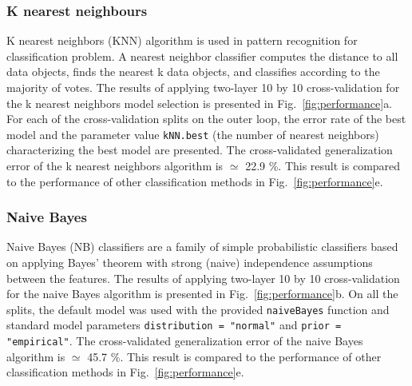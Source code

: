 \documentclass[10pt, paper=a4]{article}
\begin{document}
\subsubsection{K nearest neighbours}  %
K nearest neighbors (KNN) algorithm is used in pattern recognition for
classification problem.  A nearest neighbor classifier computes the
distance to all data objects, finds the nearest k data objects, and
classifies according to the majority of votes.  The results of
applying two-layer 10 by 10 cross-validation for the k nearest
neighbors model selection is presented in Fig.~\ref{fig:performance}a.
For each of the cross-validation splits on the outer loop, the error
rate of the best model and the parameter value \verb|kNN.best| (the
number of nearest neighbors) characterizing the best model are
presented.  The cross-validated generalization error of the k nearest
neighbors algorithm is $\simeq$ 22.9 \%.  This result is compared to
the performance of other classification methods in
Fig.~\ref{fig:performance}e.

\subsubsection{Naive Bayes}  %
Naive Bayes (NB) classifiers are a family of simple probabilistic
classifiers based on applying Bayes' theorem with strong (naive)
independence assumptions between the features.  The results of
applying two-layer 10 by 10 cross-validation for the naive Bayes
algorithm is presented in Fig.~\ref{fig:performance}b.  On all the
splits, the default model was used with the provided \verb|naiveBayes|
function and standard model parameters \verb|distribution = "normal"|
and \verb|prior = "empirical"|.  The cross-validated generalization
error of the naive Bayes algorithm is $\simeq$ 45.7 \%.  This result
is compared to the performance of other classification methods in
Fig.~\ref{fig:performance}e.
\end{document}
